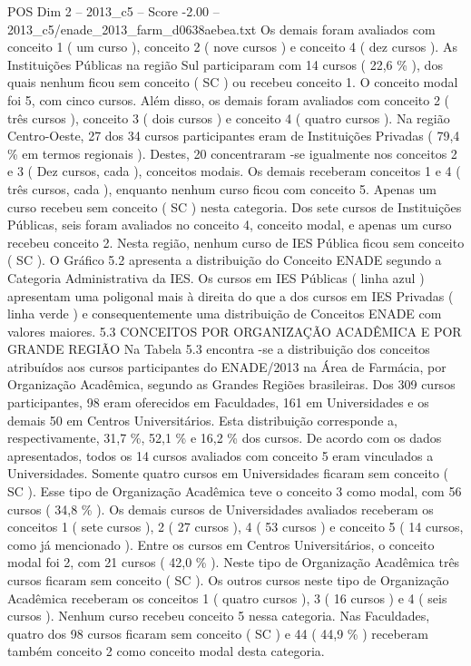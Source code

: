 \begin{textsample}{POS Dim 2 – 2013\_c5 – Score -2.00 – 2013\_c5/enade\_2013\_farm\_d0638aebea.txt}
Os demais foram avaliados com conceito 1 ( um curso ), conceito 2 ( nove cursos ) e conceito 4 ( dez cursos ).
As Instituições Públicas na região Sul participaram com 14 cursos ( 22,6 \% ), dos quais nenhum ficou sem conceito ( SC ) ou recebeu conceito 1.
O conceito modal foi 5, com cinco cursos.
Além disso, os demais foram avaliados com conceito 2 ( três cursos ), conceito 3 ( dois cursos ) e conceito 4 ( quatro cursos ).
Na região Centro-Oeste, 27 dos 34 cursos participantes eram de Instituições Privadas ( 79,4 \% em termos regionais ).
Destes, 20 concentraram -se igualmente nos conceitos 2 e 3 ( Dez cursos, cada ), conceitos modais.
Os demais receberam conceitos 1 e 4 ( três cursos, cada ), enquanto nenhum curso ficou com conceito 5.
Apenas um curso recebeu sem conceito ( SC ) nesta categoria.
Dos sete cursos de Instituições Públicas, seis foram avaliados no conceito 4, conceito modal, e apenas um curso recebeu conceito 2.
Nesta região, nenhum curso de IES Pública ficou sem conceito ( SC ).
O Gráfico 5.2 apresenta a distribuição do Conceito ENADE segundo a Categoria Administrativa da IES.
Os cursos em IES Públicas ( linha azul ) apresentam uma poligonal mais à direita do que a dos cursos em IES Privadas ( linha verde ) e consequentemente uma distribuição de Conceitos ENADE com valores maiores. 5.3 CONCEITOS POR ORGANIZAÇÃO ACADÊMICA E POR GRANDE REGIÃO Na Tabela 5.3 encontra -se a distribuição dos conceitos atribuídos aos cursos participantes do ENADE/2013 na Área de Farmácia, por Organização Acadêmica, segundo as Grandes Regiões brasileiras.
Dos 309 cursos participantes, 98 eram oferecidos em Faculdades, 161 em Universidades e os demais 50 em Centros Universitários.
Esta distribuição corresponde a, respectivamente, 31,7 \%, 52,1 \% e 16,2 \% dos cursos.
De acordo com os dados apresentados, todos os 14 cursos avaliados com conceito 5 eram vinculados a Universidades.
Somente quatro cursos em Universidades ficaram sem conceito ( SC ).
Esse tipo de Organização Acadêmica teve o conceito 3 como modal, com 56 cursos ( 34,8 \% ).
Os demais cursos de Universidades avaliados receberam os conceitos 1 ( sete cursos ), 2 ( 27 cursos ), 4 ( 53 cursos ) e conceito 5 ( 14 cursos, como já mencionado ).
Entre os cursos em Centros Universitários, o conceito modal foi 2, com 21 cursos ( 42,0 \% ).
Neste tipo de Organização Acadêmica três cursos ficaram sem conceito ( SC ).
Os outros cursos neste tipo de Organização Acadêmica receberam os conceitos 1 ( quatro cursos ), 3 ( 16 cursos ) e 4 ( seis cursos ).
Nenhum curso recebeu conceito 5 nessa categoria.
Nas Faculdades, quatro dos 98 cursos ficaram sem conceito ( SC ) e 44 ( 44,9 \% ) receberam também conceito 2 como conceito modal desta categoria.

\end{textsample}
